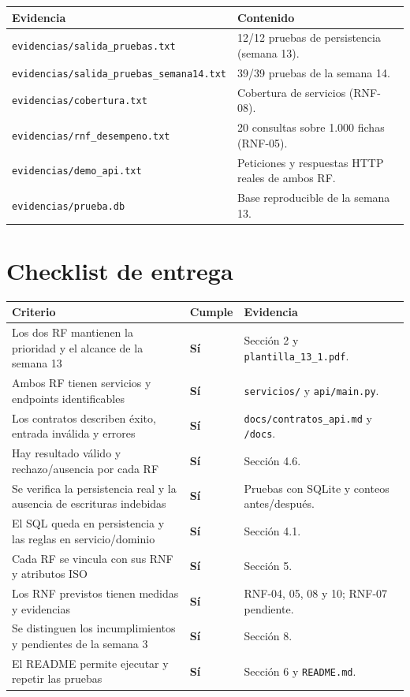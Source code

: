\documentclass[11pt,a4paper]{article}
\newcommand{\code}[1]{\texttt{#1}}
\newcommand{\thead}[1]{\textbf{#1}}
\begin{document}
{\footnotesize
\begin{tabularx}{\linewidth}{@{}V{0.7}V{1.3}@{}}
\toprule
\thead{Evidencia} & \thead{Contenido} \\ \midrule
\code{evidencias/salida\_pruebas.txt} & 12/12 pruebas de persistencia
(semana 13). \\
\code{evidencias/salida\_pruebas\_semana14.txt} & 39/39 pruebas de la
semana 14. \\
\code{evidencias/cobertura.txt} & Cobertura de servicios (RNF-08). \\
\code{evidencias/rnf\_desempeno.txt} & 20 consultas sobre 1.000 fichas
(RNF-05). \\
\code{evidencias/demo\_api.txt} & Peticiones y respuestas HTTP reales de ambos
RF. \\
\code{evidencias/prueba.db} & Base reproducible de la semana 13. \\
\bottomrule
\end{tabularx}
}

\clearpage

\section{Checklist de entrega}

{\footnotesize
\begin{tabularx}{\linewidth}{@{}V{1.9}Z{0.35}V{0.75}@{}}
\toprule
\thead{Criterio} & \thead{Cumple} & \thead{Evidencia} \\ \midrule
Los dos RF mantienen la prioridad y el alcance de la semana 13 & \textbf{Sí} &
Sección 2 y \code{plantilla\_13\_1.pdf}. \\
Ambos RF tienen servicios y endpoints identificables & \textbf{Sí} &
\code{servicios/} y \code{api/main.py}. \\
Los contratos describen éxito, entrada inválida y errores & \textbf{Sí} &
\code{docs/contratos\_api.md} y \code{/docs}. \\
Hay resultado válido y rechazo/ausencia por cada RF & \textbf{Sí} &
Sección 4.6. \\
Se verifica la persistencia real y la ausencia de escrituras indebidas &
\textbf{Sí} & Pruebas con SQLite y conteos antes/después. \\
El SQL queda en persistencia y las reglas en servicio/dominio & \textbf{Sí} &
Sección 4.1. \\
Cada RF se vincula con sus RNF y atributos ISO & \textbf{Sí} & Sección 5. \\
Los RNF previstos tienen medidas y evidencias & \textbf{Sí} &
RNF-04, 05, 08 y 10; RNF-07 pendiente. \\
Se distinguen los incumplimientos y pendientes de la semana 3 & \textbf{Sí} &
Sección 8. \\
El README permite ejecutar y repetir las pruebas & \textbf{Sí} &
Sección 6 y \code{README.md}. \\
\bottomrule
\end{tabularx}
}
\end{document}
